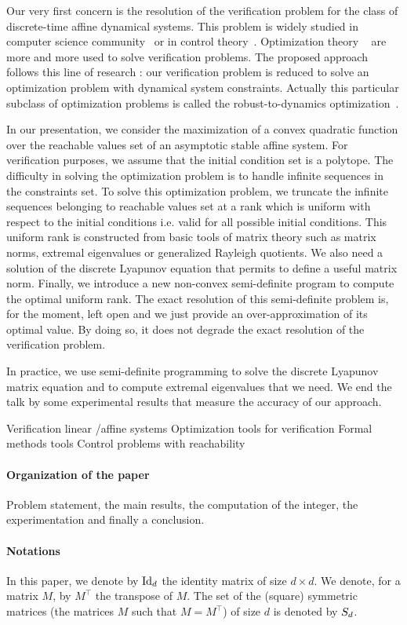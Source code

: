 \documentclass[10pt]{article}
\begin{document}
Our very first concern is the resolution of the verification problem for the class of discrete-time affine dynamical systems. This problem is widely studied in computer science community~\cite{mine} or in control theory~\cite{safety}. Optimization theory 
~\cite{optim} are more and more used to solve verification problems. The proposed approach follows this line of research : our verification problem is reduced to solve an optimization problem with dynamical system constraints. Actually this particular subclass of optimization problems is called the robust-to-dynamics optimization~\cite{ahmadi}. 

In our presentation, we consider the maximization of a convex quadratic function over the reachable values set of an asymptotic stable affine system. For verification purposes, we assume that the initial condition set is a polytope. The difficulty in solving the optimization problem is to handle infinite sequences in the constraints set. To solve this optimization problem, we truncate the infinite sequences belonging to reachable values set at a rank which is uniform with respect to the initial conditions i.e. valid for all possible initial conditions.   
This uniform rank is constructed from basic tools of matrix theory such as matrix norms, extremal eigenvalues or generalized Rayleigh quotients. We also need a solution of the discrete Lyapunov equation that permits to define a useful matrix norm. Finally, we introduce a new non-convex semi-definite program to compute the optimal uniform rank. The exact resolution of this semi-definite problem is, for the moment, left open and we just provide an over-approximation of its optimal value. By doing so, it does not degrade the exact resolution of the verification problem.  

In practice, we use semi-definite programming to solve the discrete Lyapunov matrix equation and to compute extremal eigenvalues that we need. We end the talk by some experimental results that measure the accuracy of our approach.

Verification linear /affine systems
Optimization tools for verification
Formal methods tools 
Control problems with reachability

\paragraph{Organization of the paper}
Problem statement, the main results, the computation of the integer, the experimentation and finally a conclusion.
\paragraph{Notations}
In this paper, we denote by $\operatorname{Id}_d$ the identity matrix of size $d\times d$. We denote, for a matrix $M$, by $M^\intercal$ the transpose of $M$. The set of the (square) symmetric matrices  (the matrices $M$ such that $M=M^\intercal$) of size $d$ is denoted by $S_d$.  
\end{document}
